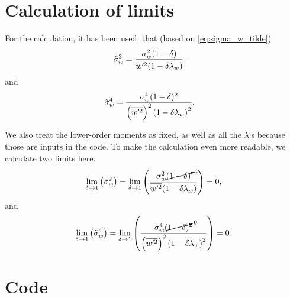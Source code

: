 \appendix


\chapter{Calculation of limits}\label{ch:calculation-of-limits}

For the calculation, it has been used, that (based on \cref{eq:sigma_w_tilde})
\begin{align}
    \label{eq:sigma_w_tilde_2}
    \tilde{\sigma}_w^2
    &= \frac{\sigma_w^2 (1-\delta)}{\overline{w'^2} (1-\delta\lambda_w)},
\end{align}
and
\begin{align}
    \label{eq:sigma_w_tilde_4}
    \tilde{\sigma}_w^4
    &= \frac{\sigma_w^4 (1-\delta)^2}{\left(\overline{w'^2}\right)^2 \left(1-\delta\lambda_w\right)^2}.
\end{align}

We also treat the lower-order moments as fixed, as well as all the $\lambda$`s because those are inputs in the code.
To make the calculation even more readable,
we calculate two limits here.
\begin{align}
    \label{eq:sigma_w_tilde_2_limit_delta_to_1}
    \lim_{\delta \to 1}\left(\tilde{\sigma}_w^2\right)
    = \lim_{\delta \to 1}\left(\frac{\sigma_w^2 \cancelto{0}{(1-\delta)}}{\overline{w'^2} (1-\delta\lambda_w)}\right)
    = 0,
\end{align}
and
\begin{align}
    \label{eq:sigma_w_tilde_4_limit_delta_to_1}
    \lim_{\delta \to 1}\left(\tilde{\sigma}_w^4\right)
    = \lim_{\delta \to 1}\left(\frac{\sigma_w^4 \cancelto{0}{(1-\delta)}^2}{\left(\overline{w'^2}\right)^2 \left(1-\delta\lambda_w\right)^2}\right)
    = 0.
\end{align}









\chapter{Code}\label{ch:code}
















